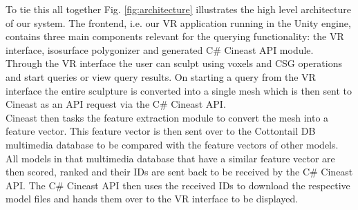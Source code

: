 To tie this all together Fig. \ref{fig:architecture} illustrates the high level architecture of our system. The frontend, i.e. our VR application running in the Unity
engine, contains three main components relevant for the querying functionality: the VR interface, isosurface polygonizer and generated C\# Cineast API module.\\
Through the VR interface the user can sculpt using voxels and CSG operations and start queries or view query results. On starting a query from the VR interface the entire sculpture is converted into a single mesh which is then sent to Cineast as an API request via the C\# Cineast API.\\
Cineast then tasks the feature extraction module to convert the mesh into a feature vector. This feature vector is then sent over to the Cottontail DB multimedia database to be
compared with the feature vectors of other models. All models in that multimedia database that have a similar feature vector are then scored, ranked and their IDs are sent back to be received by the C\# Cineast API. The C\# Cineast API then uses the received IDs to download the respective model files and hands them over to the VR interface to be displayed.


